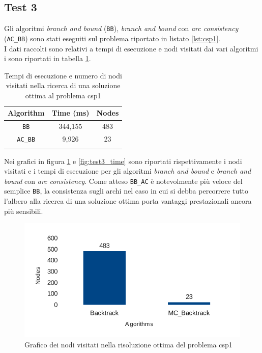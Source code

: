 \documentclass[10pt, a4paper]{article}
\begin{document}
\subsection{Test 3}
Gli algoritmi \textit{branch and bound} (\texttt{BB}), \textit{branch and bound} con \textit{arc consistency} (\texttt{AC\_BB}) sono stati eseguiti sul problema riportato in listato \ref{lst:csp1}.\\
I dati raccolti sono relativi a tempi di esecuzione e nodi visitati dai vari algoritmi i sono riportati in tabella \ref{tab:test2}.

\begin{longtable}{c c c}
\toprule
\textbf{Algorithm} & \textbf{Time (ms)} & \textbf{Nodes}\\
\midrule
\texttt{BB} & 344,155 & 483 \\
\midrule
\texttt{AC\_BB} & 9,926 & 23 \\
\bottomrule
\caption{Tempi di esecuzione e numero di nodi visitati nella ricerca di una soluzione ottima al problema csp1}
\label{tab:test2}
\end{longtable}

Nei grafici in figura \ref{fig:test3_nodes} e \ref{fig:test3_time} sono riportati rispettivamente i nodi visitati e i tempi di esecuzione per gli algoritmi \textit{branch and bound} e \textit{branch and bound} con \textit{arc consistency}. Come atteso \texttt{BB\_AC} è notevolmente più veloce del semplice \texttt{BB}, la consistenza sugli archi nel caso in cui si debba percorrere tutto l'albero alla ricerca di una soluzione ottima porta vantaggi prestazionali ancora più sensibili.

\begin{figure}[!h]
\begin{center}
\includegraphics[scale=0.7]{./report-images/test3_nodes.pdf}
\caption{Grafico dei nodi visitati nella risoluzione ottima del problema csp1}
\label{fig:test3_nodes}
\end{center}
\end{figure}
\end{document}
